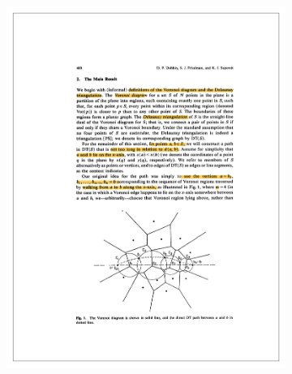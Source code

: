 \begin{figure}[ht]
\begin{subfigure}{0.48\textwidth}
\includegraphics[width=\linewidth]{Figures/DFS_a.pdf}
\caption{} \label{fig:DFS_a}
\end{subfigure}
\hspace*{\fill}
\begin{subfigure}{0.48\textwidth}

\end{subfigure}
\end{figure}
